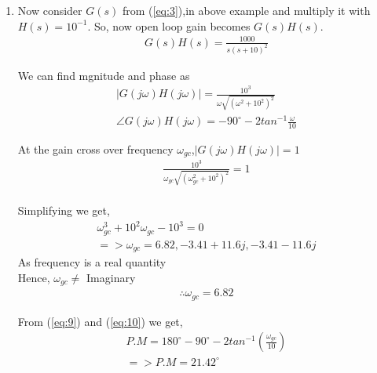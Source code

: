 \begin{enumerate}[label=\thesection.\arabic*.,ref=\thesection.\theenumi]
\item
Now consider $G(s)$ from (\ref{eq:3}),in above example and multiply it with $H(s)=10^{-1}$. So, now open loop gain becomes $G(s)H(s)$.
\begin{align}
G(s)H(s)=\frac{1000}{s(s+10)^{2}}
\label{eq:8} 
\end{align}

We can find mgnitude and phase as \\
\begin{align}
|G(j\omega)H(j\omega)|=\frac{10^{3}}{\omega \sqrt{(\omega^{2}+10^{2})^{2}}} \\
\angle G(j\omega)H(j\omega)=-90^{\circ}-2tan^{-1}\frac{\omega}{10} \label{eq:9} 
\end{align}

At the gain cross over frequency $\omega_{gc}$,$|G(j\omega)H(j\omega)|=1$
\\
\begin{align}
\frac{10^{3}}{\omega_{gc} \sqrt{(\omega_{gc}^{2}+10^{2})^{2}}}=1 \\
\end{align}

Simplifying we get,
\begin{align}
\omega_{gc}^{3}+10^{2}\omega_{gc}-10^{3}=0 \\
=> \omega_{gc}=6.82,-3.41+11.6j,-3.41-11.6j
\end{align}
As frequency is a real quantity
\\Hence, $\omega_{gc} \neq$ Imaginary
\begin{align}
\therefore  \omega_{gc} =6.82   \label{eq:10} 
\end{align}

From (\ref{eq:9}) and (\ref{eq:10}) we get,
\begin{align}
P.M=180^{\circ}-90^{\circ}-2tan^{-1}(\frac{\omega_{gc}}{10}) \\
=> P.M=21.42^{\circ}
\end{align}


\end{enumerate}

